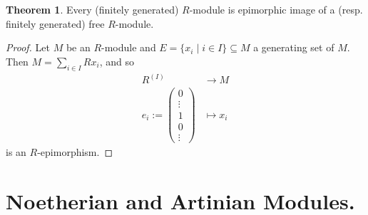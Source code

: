 \documentclass[12pt,a4paper]{report}
\theoremstyle{definition}
\newtheorem{theorem}{Theorem}[chapter] %
\theoremstyle{num.custom-title}
\DeclareMathOperator{\sse}{\subseteq}
\begin{document}
\begin{theorem}\label{fg-mod_is_epi-image}
Every (finitely generated) $R$-module is epimorphic image of a (resp. finitely generated) free $R$-module.
\begin{proof}
Let $M$ be an $R$-module and $E = \{x_i \mid i \in I\} \sse M$ a generating set of $M$. Then $M=\sum_{i \in I} R x_i$, and so
\begin{align*}
R^{(I)} &\to M \\
e_i := 
\begin{pmatrix}
0 \\
\vdots \\
1 \\
0 \\
\vdots
\end{pmatrix}
&\mapsto x_i
\end{align*}
is an $R$-epimorphism.
\end{proof}
\end{theorem}

\section{Noetherian and Artinian Modules.}
\end{document}
